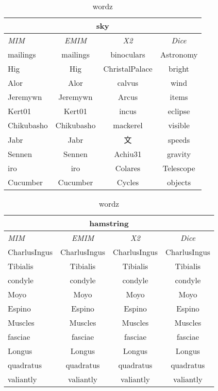 \begin{table}[h!]
\centering
\begin{tabular}{ l | c | c | c }
\hline
\multicolumn{4}{c}{sky}\\
\hline
\textit{MIM} & \textit{EMIM} & \textit{X2} & \textit{Dice}\\
\hline
mailings & mailings & binoculars & Astronomy\\
Hig & Hig & ChristalPalace & bright\\
Alor & Alor & calvus & wind\\
Jeremywn & Jeremywn & Arcus & items\\
Kert01 & Kert01 & incus & eclipse\\
Chikubasho & Chikubasho & mackerel & visible\\
Jabr & Jabr & 文 & speeds\\
Sennen & Sennen & Achiu31 & gravity\\
iro & iro & Colares & Telescope\\
Cucumber & Cucumber & Cycles & objects\\
\hline
\end{tabular}
\caption{wordz}
\label{tab:words}
\end{table}
\begin{table}[h!]
\centering
\begin{tabular}{ l | c | c | c }
\hline
\multicolumn{4}{c}{hamstring}\\
\hline
\textit{MIM} & \textit{EMIM} & \textit{X2} & \textit{Dice}\\
\hline
CharlusIngus & CharlusIngus & CharlusIngus & CharlusIngus\\
Tibialis & Tibialis & Tibialis & Tibialis\\
condyle & condyle & condyle & condyle\\
Moyo & Moyo & Moyo & Moyo\\
Espino & Espino & Espino & Espino\\
Muscles & Muscles & Muscles & Muscles\\
fasciae & fasciae & fasciae & fasciae\\
Longus & Longus & Longus & Longus\\
quadratus & quadratus & quadratus & quadratus\\
valiantly & valiantly & valiantly & valiantly\\
\hline
\end{tabular}
\caption{wordz}
\label{tab:words}
\end{table}
